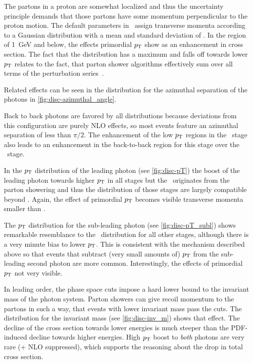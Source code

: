 The partons in a proton are somewhat localized and thus the
uncertainty principle demands that those partons have some momentum
perpendicular to the proton motion. The default parameters in \sherpa\
assign transverse momenta according to a Gaussian distribution with a
mean and standard deviation of \gev{.8}.  In the region of
\SI{1}{\giga\electronvolt} and below, the effects primordial \(p_\mathrm{T}\)
show as an enhancement in cross section.
The fact that the distribution has a maximum and falls off towards
lower \(p_\mathrm{T}\) relates to the fact, that parton shower algorithms
effectively sum over all terms of the perturbation
series~\cite{buckley:2011ge}.

Related effects can be seen in the distribution for the azimuthal
separation of the photons in \cref{fig:disc-azimuthal_angle}.

Back to back photons are favored by all distributions because
deviations from this configuration are purely NLO effects, so most
events feature an azimuthal separation of less than \(\pi/2\).  The
enhancement of the low \(p_\mathrm{T}\) regions in the \stthree\ stage also
leads to an enhancement in the back-to-back region for this stage over
the \sttwo\ stage.

In the \(p_\mathrm{T}\) distribution of the leading photon (see
\cref{fig:disc-pT}) the boost of the leading photon towards higher
\(p_\mathrm{T}\) in all stages but the \stone\ originates from the parton
showering and thus the distribution of those stages are largely
compatible beyond . Again, the effect of primordial \(p_\mathrm{T}\)
becomes visible transverse momenta smaller than \gev{1}.

The \(p_\mathrm{T}\) distribution for the sub-leading photon (see
\cref{fig:disc-pT_subl}) shows remarkable resemblance to the \stone\
distribution for all other stages, although there is a very minute
bias to lower \(p_\mathrm{T}\). This is consistent with the mechanism described
above so that events that subtract (very small amounts of) \(p_\mathrm{T}\)
from the sub-leading second photon are more common. Interestingly, the
effects of primordial \(p_\mathrm{T}\) not very visible.

In leading order, the phase space cuts impose a hard lower bound to
the invariant mass of the photon system. Parton showers can give
recoil momentum to the partons in such a way, that events with lower
invariant mass pass the cuts. The distribution for the invariant mass
(see \cref{fig:disc-inv_m}) shows that effect. The decline of the
cross section towards lower energies is much steeper than the
PDF-induced decline towards higher energies. High \(p_\mathrm{T}\) boost to
\emph{both} photons are very rare (+ NLO suppressed), which supports
the reasoning about the drop in total cross section.


